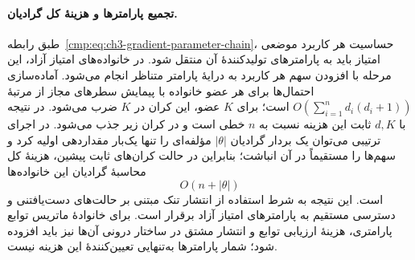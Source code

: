 \paragraph{تجمیع پارامترها و هزینهٔ کل گرادیان.}
طبق رابطه~\eqref{cmp:eq:ch3-gradient-parameter-chain}،
حساسیت هر کاربرد موضعی امتیاز باید به پارامترهای
تولیدکنندهٔ آن منتقل شود. در خانواده‌های
امتیاز آزاد، این مرحله با افزودن سهم هر
کاربرد به درایهٔ پارامتر متناظر انجام می‌شود.
آماده‌سازی احتمال‌ها برای هر عضو خانواده
با پیمایش سطرهای مجاز از مرتبهٔ
$O(\sum_{i=1}^{n}d_i(d_i+1))$ است؛ برای
$K$ عضو، این کران در $K$ ضرب می‌شود.
در نتیجه با $d,K$ ثابت این هزینه نسبت به
$n$ خطی است و در کران زیر جذب می‌شود.
در اجرای ترتیبی می‌توان یک بردار گرادیان
$|\theta|$ مؤلفه‌ای را تنها یک‌بار مقداردهی اولیه کرد
و سهم‌ها را مستقیماً در آن انباشت؛ بنابراین
در حالت کران‌های ثابت پیشین، هزینهٔ کل
محاسبهٔ گرادیان این خانواده‌ها
\begin{equation}\label{cmp:eq:ch3-gradient-linear-work}
O(n+|\theta|)
\end{equation}
است. این نتیجه به شرط استفاده از انتشار
تنک مبتنی بر حالت‌های دست‌یافتنی و دسترسی
مستقیم به پارامترهای امتیاز آزاد برقرار است.
برای خانوادهٔ ماتریس توابع پارامتری، هزینهٔ
ارزیابی توابع و انتشار مشتق در ساختار درونی
آن‌ها نیز باید افزوده شود؛ شمار پارامترها
به‌تنهایی تعیین‌کنندهٔ این هزینه نیست.


